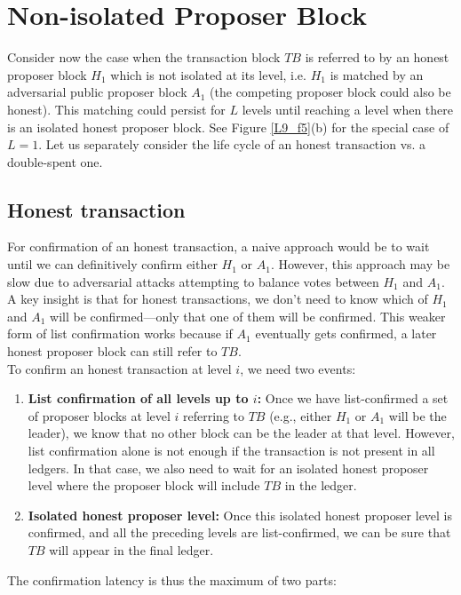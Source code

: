 \section{Non-isolated Proposer Block}
Consider now the case when the transaction block $TB$ is referred to by an honest proposer block $H_{1}$  which is not isolated at its level, i.e. $H_{1}$ is matched by an adversarial public proposer block $A_{1}$ (the competing proposer block could also be honest). This matching could persist for $L$ levels until reaching a level when there is an isolated honest proposer block. See Figure \ref{L9_f5}(b) for the special  case of $L = 1$. Let us separately consider the life cycle of an honest transaction vs. a double-spent one.
\subsection{Honest transaction}
For confirmation of an honest transaction, a naive approach would be to wait until we can definitively confirm either $H_{1}$ or $A_{1}$. However, this approach may be slow due to adversarial attacks attempting to balance votes between $H_{1}$ and $A_{1}$. A key insight is that for honest transactions, we don't need to know which of $H_{1}$ and $A_{1}$ will be confirmed—only that one of them will be confirmed. This weaker form of list confirmation works because if $A_{1}$ eventually gets confirmed, a later honest proposer block can still refer to $TB$.\\
To confirm an honest transaction at level $i$, we need two events:
\begin{enumerate}
	\item \textbf{List confirmation of all levels up to $i$:} Once we have list-confirmed a set of proposer blocks at level $i$ referring to $TB$ (e.g., either $H_{1}$ or $A_{1}$ will be the leader), we know that no other block can be the leader at that level. However, list confirmation alone is not enough if the transaction is not present in all ledgers. In that case, we also need to wait for an isolated honest proposer level where the proposer block will include $TB$ in the ledger.
	\item \textbf{Isolated honest proposer level:} Once this isolated honest proposer level is confirmed, and all the preceding levels are list-confirmed, we can be sure that $TB$ will appear in the final ledger.
\end{enumerate}
The confirmation latency is thus the maximum of two parts:\\
